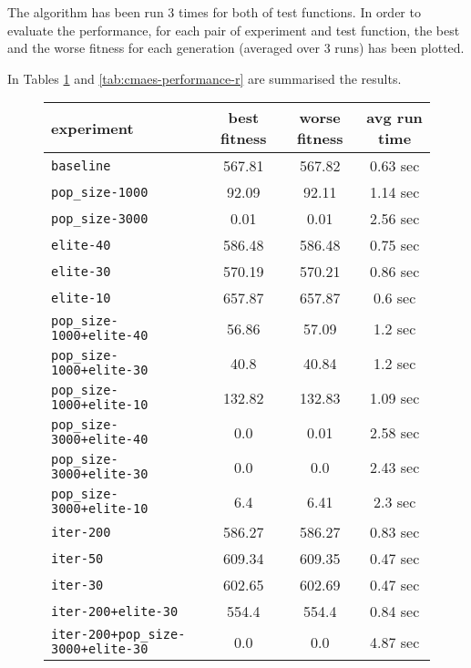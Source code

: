 The algorithm has been run 3 times for both of test functions. 
In order to evaluate the performance, for each pair of experiment and test function, the best and the worse fitness for each generation (averaged over 3 runs) has been plotted. 

In Tables \ref{tab:cmaes-performance-s} and \ref{tab:cmaes-performance-r} are summarised the results. 

\begin{figure}[htb]
	\centering
	
	\begin{tabular}{lccc}
		\toprule
		\textbf{experiment} & \textbf{best fitness} & \textbf{worse fitness} & \textbf{avg run time} \\
		\midrule
		\texttt{baseline 						}		&	567.81 &	 567.82 &	  0.63 sec \\
		\texttt{pop\_size-1000 					}		  &	 92.09 &	  92.11 &	  1.14 sec \\
		\texttt{pop\_size-3000 					}		  &	  0.01 &	   0.01 &	  2.56 sec \\
		\texttt{elite-40 						}		&	586.48 &	 586.48 &	  0.75 sec \\
		\texttt{elite-30 						}		&	570.19 &	 570.21 &	  0.86 sec \\
		\texttt{elite-10 						}		&	657.87 &	 657.87 &	   0.6 sec \\
		\texttt{pop\_size-1000+elite-40 		}	 &	 56.86 &	  57.09 &	   1.2 sec \\
		\texttt{pop\_size-1000+elite-30 		}	 &	  40.8 &	  40.84 &	   1.2 sec \\
		\texttt{pop\_size-1000+elite-10 		}	 &	132.82 &	 132.83 &	  1.09 sec \\
		\texttt{pop\_size-3000+elite-40 		}	 &	   0.0 &	   0.01 &	  2.58 sec \\
		\texttt{pop\_size-3000+elite-30 		}	 &	   0.0 &	    0.0 &	  2.43 sec \\
		\texttt{pop\_size-3000+elite-10 		}	 &	   6.4 &	   6.41 &	   2.3 sec \\
		\texttt{iter-200 						}		&	586.27 &	 586.27 &	  0.83 sec \\
		\texttt{iter-50 						}		 &	609.34 &	 609.35 &	  0.47 sec \\
		\texttt{iter-30 						}		 &	602.65 &	 602.69 &	  0.47 sec \\
		\texttt{iter-200+elite-30 				}	&	 554.4 &	  554.4 &	  0.84 sec \\
		\texttt{iter-200+pop\_size-3000+elite-30} 	 &	   0.0 &	    0.0 &	  4.87 sec \\
		
		\bottomrule
	\end{tabular}
	\label{tab:cmaes-performance-s}
\end{figure}

